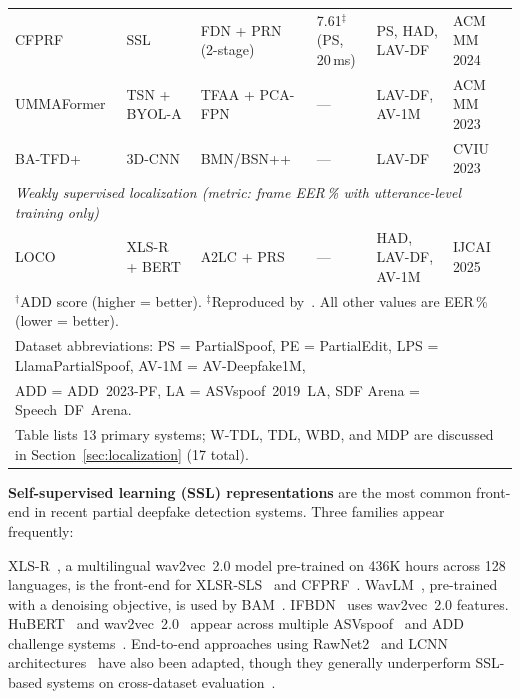 \documentclass[journal]{IEEEtran}
\begin{document}
\begin{table}[t]
\begin{tabular}{llllll}
\midrule
CFPRF~\cite{wu2024cfprf}           & SSL        & FDN + PRN (2-stage)  & 7.61$^\ddagger$ (PS, 20\,ms)  & PS, HAD, LAV-DF & ACM MM 2024 \\
UMMAFormer~\cite{zhang2023ummaformer} & TSN + BYOL-A & TFAA + PCA-FPN  & ---                 & LAV-DF, AV-1M  & ACM MM 2023 \\
BA-TFD+~\cite{cai2023lavdf_cviu}   & 3D-CNN     & BMN/BSN++            & ---                 & LAV-DF         & CVIU 2023 \\
\midrule
\multicolumn{6}{l}{\textit{Weakly supervised localization (metric: frame EER\,\% with utterance-level training only)}} \\
\midrule
LOCO~\cite{wu2025loco}             & XLS-R~\cite{babu2022xlsr} + BERT & A2LC + PRS         & ---                 & HAD, LAV-DF, AV-1M & IJCAI 2025 \\
\bottomrule
\multicolumn{6}{l}{\footnotesize $^\dag$ADD score (higher = better). $^\ddagger$Reproduced by~\cite{luong2025metrics}. All other values are EER\,\% (lower = better).} \\
\multicolumn{6}{l}{\footnotesize Dataset abbreviations: PS = PartialSpoof, PE = PartialEdit, LPS = LlamaPartialSpoof, AV-1M = AV-Deepfake1M,} \\
\multicolumn{6}{l}{\footnotesize ADD = ADD~2023-PF, LA = ASVspoof~2019~LA, SDF Arena = Speech~DF~Arena.} \\
\multicolumn{6}{l}{\footnotesize Table lists 13 primary systems; W-TDL, TDL, WBD, and MDP are discussed in Section~\ref{sec:localization} (17 total).}
\end{tabular}
\end{table}

\textbf{Self-supervised learning (SSL) representations} are the most common front-end in recent partial deepfake detection systems. Three families appear frequently:

XLS-R~\cite{babu2022xlsr}, a multilingual wav2vec~2.0 model pre-trained on 436K hours across 128 languages, is the front-end for XLSR-SLS~\cite{zhang2024xlrsls} and CFPRF~\cite{wu2024cfprf}. WavLM~\cite{chen2022wavlm}, pre-trained with a denoising objective, is used by BAM~\cite{zhong2024bam}. IFBDN~\cite{cai2024ifbdn} uses wav2vec~2.0 features. HuBERT~\cite{hsu2021hubert} and wav2vec~2.0~\cite{baevski2020wav2vec2} appear across multiple ASVspoof~\cite{wang2020asvspoof2019,nautsch2021asv} and ADD challenge systems~\cite{yi2023add}. End-to-end approaches using RawNet2~\cite{tak2021rawnet2} and LCNN architectures~\cite{chen2020lcnn,lavrentyeva2019stc} have also been adapted, though they generally underperform SSL-based systems on cross-dataset evaluation~\cite{speechdfarena2025,ali2026spoofsuperb}.
\end{document}
